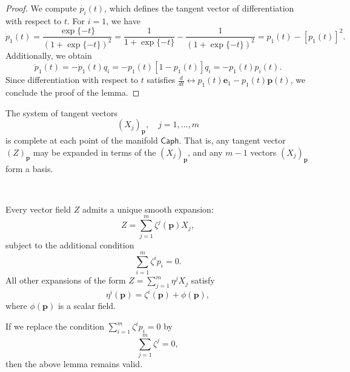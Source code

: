 \begin{proof}
We compute $\dot{p_i}(t)$, which defines the tangent vector of differentiation with respect to $t$. For $i=1$, we have
\[
\dot{p}_1 (t)= \frac{\exp\{ - t\}}{(1+ \exp \{-t\})^2}= \frac{1}{1 + \exp \{ -t\}}- \frac{1}{(1 + \exp \{ -t\})^2} = p_1 (t) - [p_1(t)]^2.
\]
Additionally, we obtain
\[
\dot{p}_1(t)= - \dot{p}_1(t)q_i = -p_1(t) [1 - p_1(t)]q_i = - p_1 (t)  p_i (t).
\]
Since differentiation with respect to $t$ satisfies $\frac{d}{dt} \longleftrightarrow p_1(t) \mathbf{e}_1 - p_1(t)\mathbf{p}(t)$, we conclude the proof of the lemma. 
\end{proof}

\begin{lemma}
    The system of tangent vectors \[(X_j)_{\mathbf{p}},\quad j= 1,\dots,m\] is complete at each point of the manifold $\mathsf{Caph}$. That is, any tangent vector $(Z)_{\mathbf{p}}$ may be expanded in terms of the $(X_j)_{\mathbf{p}}$, and any $m-1$ vectors $(X_j)_{\mathbf{p}}$ form a basis. 
    
    \, 
    
    Every vector field $Z$ admits a unique smooth expansion:
    \[
    Z= \sum_{j=1}^m \zeta^j(\mathbf{p})X_j,
    \]
    subject to the additional condition
    \[
    \sum_{i=1}^m \zeta^i p_i = 0.
    \]
    All other expansions of the form $Z= \sum_{j=1}^m \eta^j X_j$ satisfy
    \[
    \eta^i(\mathbf{p})= \zeta^i(\mathbf{p})+ \phi(\mathbf{p}),
    \]
    where $\phi(\mathbf{p})$ is a scalar field.
\end{lemma}

\begin{remark}
    If we replace the condition $\sum_{i=1}^m \zeta^i p_i = 0$ by 
    \[
    \sum_{j=1}^m \zeta^j = 0,
    \]
    then the above lemma remains valid.
\end{remark}

